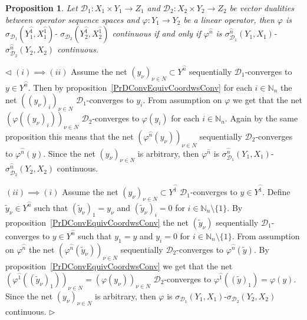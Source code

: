 \documentclass[12pt]{article}
\newtheorem{proposition}[theorem]{Proposition}
\newenvironment{proof}{\par $\triangleleft$}{$\triangleright$}
\begin{document}
\begin{proposition}\label{PrDContEquivCoordwsCont}
Let $\mathcal{D}_1:X_1\times Y_1\to Z_1$ and 
$\mathcal{D}_2:X_2\times Y_2\to Z_2$ be vector dualities between operator 
sequence spaces and $\varphi:Y_1\to Y_2$ be a linear operator, then $\varphi$ is 
$\sigma_{\mathcal{D}_1}(Y_1^{\wideparen{1}},X_1^{\wideparen{1}})$-
$\sigma_{\mathcal{D}_2}(Y_2^{\wideparen{1}},X_2^{\wideparen{1}})$ continuous if 
and only if $\varphi^{\wideparen{n}}$ is 
$\sigma_{\mathcal{D}_1}^{\wideparen{n}}(Y_1,X_1)$-
$\sigma_{\mathcal{D}_2}^{\wideparen{n}}(Y_2,X_2)$ continuous.
\end{proposition}
\begin{proof}
$(i)\implies (ii)$ Assume the net 
${(y_\nu)}_{\nu\in N}\subset Y^{\wideparen{n}}$ 
sequentially $\mathcal{D}_1$-converges to $y\in Y^{\wideparen{n}}$. Then by 
proposition~\ref{PrDConvEquivCoordwsConv} for each $i\in\mathbb{N}_n$ the net 
${({(y_\nu)}_i)}_{\nu\in N}$ $\mathcal{D}_1$-converges to $y_i$. 
From assumption on $\varphi$ we get that the 
net ${(\varphi({(y_\nu)}_i))}_{\nu\in N}$ 
$\mathcal{D}_2$-converges to $\varphi(y_i)$ for each $i\in\mathbb{N}_n$. Again 
by the same proposition this means that the net 
${(\varphi^{\wideparen{n}}(y_\nu))}_{\nu\in N}$ sequentially 
$\mathcal{D}_2$-converges to $\varphi^{\wideparen{n}}(y)$. Since the net 
${(y_\nu)}_{\nu\in N}$ is arbitrary, then $\varphi^{\widehat{n}}$ is 
$\sigma_{\mathcal{D}_1}^{\wideparen{n}}(Y_1,X_1)$-
$\sigma_{\mathcal{D}_2}^{\wideparen{n}}(Y_2,X_2)$ continuous.

$(ii)\implies (i)$ Assume the net 
${(y_\nu)}_{\nu\in N}\subset Y^{\wideparen{1}}$ $\mathcal{D}_1$-converges to 
$y\in Y^{\wideparen{1}}$. Define $\widetilde{y}_\nu\in Y^{\wideparen{n}}$ such 
that ${(\widetilde{y}_\nu)}_1=y_\nu$ and ${(\widetilde{y}_\nu)}_i=0$ for 
$i\in\mathbb{N}_n\setminus \{1 \}$. By proposition~\ref{PrDConvEquivCoordwsConv} 
the net $(\widetilde{y}_\nu)$ sequentially $\mathcal{D}_1$-converges to 
$y\in Y^{\wideparen{n}}$ such that $y_1=y$ and $y_i=0$ for 
$i\in\mathbb{N}_n\setminus \{1 \}$. From assumption on $\varphi^{\wideparen{n}}$ 
the net ${(\varphi^{\wideparen{n}}(\widetilde{y}_\nu))}_{\nu\in N}$ sequentially  
$\mathcal{D}_2$-converges to $\varphi^{\wideparen{n}}(\widetilde{y})$. By 
proposition~\ref{PrDConvEquivCoordwsConv} we get that the net 
${(\varphi^{\wideparen{1}}({(\widetilde{y}_\nu)}_1))}_{\nu\in N}
={(\varphi(y_\nu))}_{\nu\in N}$ $\mathcal{D}_2$-converges to 
$\varphi^{\wideparen{1}}({(\widetilde{y})}_1)=\varphi(y)$. Since the net 
${(y_\nu)}_{\nu\in N}$ is arbitrary, then $\varphi$ is 
$\sigma_{\mathcal{D}_1}(Y_1,X_1)$-$\sigma_{\mathcal{D}_2}(Y_2,X_2)$ continuous.
\end{proof}
\end{document}
